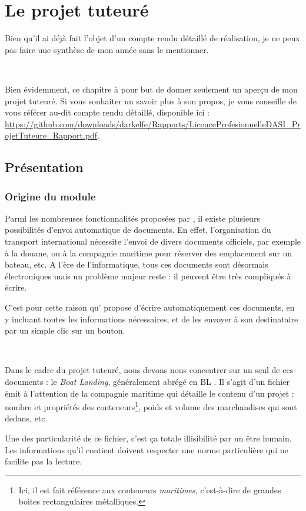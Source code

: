 \chapter{Le projet tuteuré}
Bien qu'il ai déjà fait l'objet d'un compte rendu détaillé de réalisation, je ne peux pas faire une synthèse de mon année sans le mentionner.

~

Bien évidemment, ce chapitre à pour but de donner seulement un aperçu de mon projet tuteuré. Si vous souhaiter un savoir plus à son propos, je vous conseille de vous référer au-dit compte rendu détaillé, disponible ici : \url{https://github.com/downloads/darkelfe/Rapports/LicenceProfesionnelleDASI_ProjetTuteure_Rapport.pdf}.

\section{Présentation}
\subsection{Origine du module}
Parmi les nombreuses fonctionnalités proposées par \integrale, il existe plusieurs possibilités d'envoi automatique de documents. En effet, l'organisation du transport international nécessite l'envoi de divers documents officiels, par exemple à la douane, ou à la compagnie maritime pour réserver des emplacement sur un bateau, etc. A l'ère de l'informatique, tous ces documents sont désormais électroniques mais un problème majeur reste : il peuvent être très compliqués à écrire.

C'est pour cette raison qu'\integrale{} propose d'écrire automatiquement ces documents, en y incluant toutes les informations nécessaires, et de les envoyer à son destinataire par un simple clic sur un bouton.

~

Dans le cadre du projet tuteuré, nous devons nous concentrer sur un seul de ces documents : le \emph{Boat Landing}, généralement abrégé en
\og BL \fg. Il s'agit d'un fichier émit à l'attention de la compagnie maritime qui détaille le contenu d'un projet : nombre et propriétés des conteneurs\footnote{Ici, il est fait référence aux conteneurs \emph{maritimes}, c'est-à-dire de grandes boites rectangulaires métalliques.}, poids et volume des marchandises qui sont dedans, etc.

Une des particularité de ce fichier, c'est ça totale illisibilité par un être humain. Les informations qu'il contient doivent respecter une norme particulière qui ne facilite pas la lecture.

